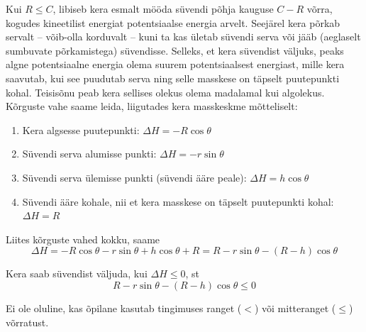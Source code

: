 Kui $R \leq C$, libiseb kera esmalt mööda süvendi põhja kauguse $C - R$ võrra, kogudes kineetilist energiat potentsiaalse energia arvelt. Seejärel kera põrkab servalt -- võib-olla korduvalt -- kuni ta kas ületab süvendi serva või jääb (aeglaselt sumbuvate põrkamistega) süvendisse. Selleks, et kera süvendist väljuks, peaks algne potentsiaalne energia olema suurem potentsiaalsest energiast, mille kera saavutab, kui see puudutab serva ning selle masskese on täpselt puutepunkti kohal. Teisisõnu peab kera sellises olekus olema madalamal kui algolekus. Kõrguste vahe saame leida, liigutades kera masskeskme mõtteliselt:
\begin{enumerate}
    \item Kera algsesse puutepunkti: $\Delta H = -R\cos\theta$
    \item Süvendi serva alumisse punkti: $\Delta H = -r\sin\theta$
    \item Süvendi serva ülemisse punkti (süvendi ääre peale): $\Delta H = h\cos\theta$
    \item Süvendi ääre kohale, nii et kera masskese on täpselt puutepunkti kohal: $\Delta H = R$
\end{enumerate}
Liites kõrguste vahed kokku, saame
\begin{equation*}
    \Delta H = -R\cos\theta - r\sin\theta + h\cos\theta + R = R-r\sin\theta-(R-h)\cos\theta
\end{equation*}

Kera saab süvendist väljuda, kui $\Delta H \leq 0$, st
\begin{equation*}
    R-r\sin\theta-(R-h)\cos\theta \leq 0
\end{equation*}

Ei ole oluline, kas õpilane kasutab tingimuses ranget ($<$) või mitteranget ($\leq$) võrratust.
\probend